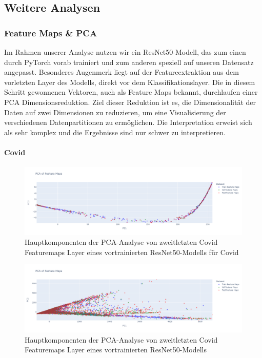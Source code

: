 \newpage

\subsection*{Weitere Analysen}
\subsubsection*{Feature Maps \& PCA} \label{chap:FeatureMaps-TestProblemEda3-mri}
Im Rahmen unserer Analyse nutzen wir ein ResNet50-Modell, das zum einen durch PyTorch vorab trainiert und zum anderen speziell auf unseren Datensatz angepasst. Besonderes Augenmerk liegt auf der Featureextraktion aus dem vorletzten Layer des Modells, direkt vor dem Klassifikationslayer. Die in diesem Schritt gewonnenen Vektoren, auch als Feature Maps bekannt, durchlaufen einer PCA Dimensionsreduktion. Ziel dieser Reduktion ist es, die Dimensionalität der Daten auf zwei Dimensionen zu reduzieren, um eine Visualisierung der verschiedenen Datenpartitionen zu ermöglichen. Die Interpretation erweist sich als sehr komplex und die Ergebnisse sind nur schwer zu interpretieren. 

\paragraph*{Covid}

\begin{figure}[H]
    \centering
    \includegraphics[width=\linewidth]{01-images/06-ending/covidx-all-feautremap-pca-ourmodel-resnet50.png}
    \caption{Hauptkomponenten der PCA-Analyse von zweitletzten Covid Featuremaps Layer eines vortrainierten ResNet50-Modells für Covid}
    \label{fig:covidx-feautremap-pca-ourmodel-resnet50}
\end{figure}

\begin{figure}[H]
    \centering
    \includegraphics[width=\linewidth]{01-images/06-ending/covidx-all-feautremap-pca-model-resnet50.png}
    \caption{Hauptkomponenten der PCA-Analyse von zweitletzten Covid Featuremaps Layer eines vortrainierten ResNet50-Modells}
    \label{fig:covidx-feautremap-pca-model-resnet50}
\end{figure}


